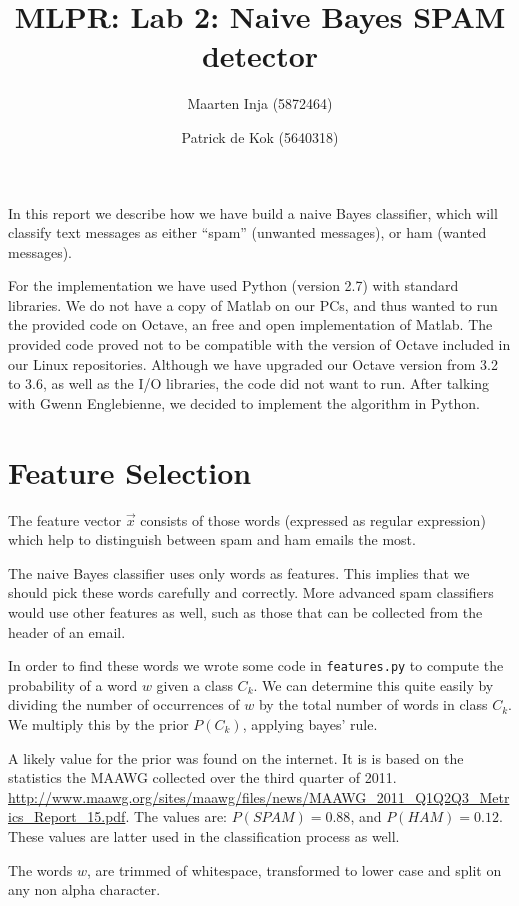\documentclass[a4paper,11pt]{article}
\author{Maarten Inja (5872464) \and Patrick de Kok (5640318)}
\title{MLPR: Lab 2: Naive Bayes SPAM detector}
\begin{document}
\maketitle

In this report we describe how we have build a naive Bayes classifier, which will classify text messages as either ``spam'' (unwanted messages), or ham (wanted messages).  

For the implementation we have used Python (version 2.7) with standard libraries.  We do not have a copy of Matlab on our PCs, and thus wanted to run the provided code on Octave, an free and open implementation of Matlab.  The provided code proved not to be compatible with the version of Octave included in our Linux repositories.  Although we have upgraded our Octave version from 3.2 to 3.6, as well as the I/O libraries, the code did not want to run.  After talking with Gwenn Englebienne, we decided to implement the algorithm in Python. 

\section{Feature Selection}
The feature vector $\vec{x}$ consists of those words (expressed as 
regular expression) which 
help to distinguish between spam and ham emails the most. 

The naive Bayes classifier uses only words as features. This implies that we should pick these words carefully and correctly. More advanced spam classifiers would use other features as well, such as those that can be collected from the header of an email.

In order to find these words we wrote some code in \texttt{features.py} 
to compute the probability of a word $w$ given a class $C_k$. We can 
determine this quite easily by dividing the number of occurrences of 
$w$ by the total number of words in class $C_k$. We multiply this by 
the prior $P(C_k)$, applying bayes' rule. 

A likely value for the prior was found on the internet. It is 
is based on the statistics the MAAWG collected over the 
 third quarter of 2011.
 \url{http://www.maawg.org/sites/maawg/files/news/MAAWG_2011_Q1Q2Q3_Metrics_Report_15.pdf}. The values are: $P(SPAM) = 0.88$, and $P(HAM) = 0.12$. These 
values are latter used in the classification process as well.

The words $w$, are trimmed of whitespace, transformed to lower case and 
split on any non alpha character. 
\end{document}
